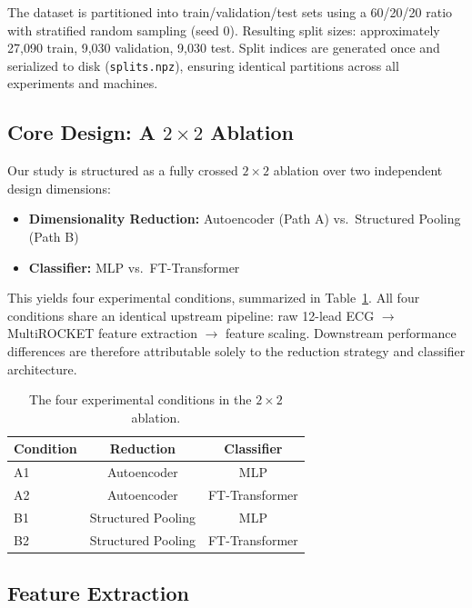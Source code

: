 \documentclass[10pt,twocolumn,letterpaper]{article}
\begin{document}
The dataset is partitioned into train/validation/test sets using a 60/20/20 ratio with stratified random sampling (seed 0). Resulting split sizes: approximately 27,090 train, 9,030 validation, 9,030 test. Split indices are generated once and serialized to disk (\texttt{splits.npz}), ensuring identical partitions across all experiments and machines.

\subsection{Core Design: A $2 \times 2$ Ablation}

Our study is structured as a fully crossed $2 \times 2$ ablation over two independent design dimensions:

\begin{itemize}
    \item \textbf{Dimensionality Reduction:} Autoencoder (Path A) vs.\ Structured Pooling (Path B)
    \item \textbf{Classifier:} MLP vs.\ FT-Transformer
\end{itemize}

This yields four experimental conditions, summarized in Table~\ref{tab:conditions}. All four conditions share an identical upstream pipeline: raw 12-lead ECG $\rightarrow$ MultiROCKET feature extraction $\rightarrow$ feature scaling. Downstream performance differences are therefore attributable solely to the reduction strategy and classifier architecture.

\begin{table}[h]
\centering
\small
\begin{tabular}{lcc}
\hline
\textbf{Condition} & \textbf{Reduction} & \textbf{Classifier} \\
\hline
A1 & Autoencoder & MLP \\
A2 & Autoencoder & FT-Transformer \\
B1 & Structured Pooling & MLP \\
B2 & Structured Pooling & FT-Transformer \\
\hline
\end{tabular}
\caption{The four experimental conditions in the $2 \times 2$ ablation.}
\label{tab:conditions}
\end{table}

\subsection{Feature Extraction}
\end{document}
